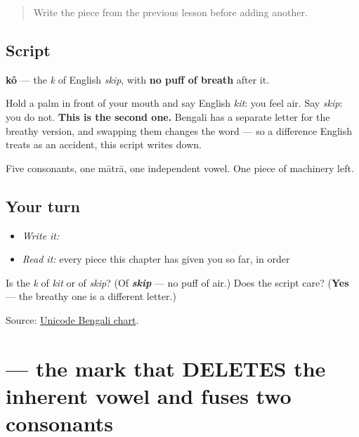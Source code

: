 \begin{quote}
Write the piece from the previous lesson before adding another.
\end{quote}

\subsection*{Script}
\begin{quote}
\end{quote}

\textbf{kô} — the \emph{k} of English \emph{skip}, with \textbf{no puff of breath} after it.

Hold a palm in front of your mouth and say English \emph{kit}: you feel air. Say \emph{skip}: you do not. \textbf{This is the second one.} Bengali has a separate letter for the breathy version, and swapping them changes the word — so a difference English treats as an accident, this script writes down.

Five consonants, one mātrā, one independent vowel. One piece of machinery left.

\subsection*{Your turn}
\begin{itemize}
\raggedright
  \item \emph{Write it:} 
  \item \emph{Read it:} every piece this chapter has given you so far, in order
\end{itemize}

\begin{tcolorbox}[breakable,colback=teal!4,colframe=teal!35!black,title={Before you move on}]
Is \textbf{} the \emph{k} of \emph{kit} or of \emph{skip}? (Of \emph{\textbf{skip}} — no puff of air.) Does the script care? (\textbf{Yes} — the breathy one is a different letter.)

Source: \href{https://www.unicode.org/charts/PDF/U0980.pdf}{Unicode Bengali chart}.
\end{tcolorbox}
\section[\texorpdfstring{\bn{্} ((hasanta))}{্ ((hasanta))}]{ — the mark that DELETES the inherent vowel and fuses two consonants}

\label{lesson:BN-W01-hasanta}



